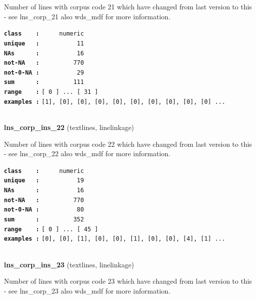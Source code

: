 \documentclass[]{article}
\begin{document}
Number of lines with corpus code 21 which have changed from last version
to this - see lns\_corp\_21 also wds\_mdf for more information.

\textbf{\texttt{class\ \ \ \ :}} \texttt{~~~~~numeric}\\
\textbf{\texttt{unique\ \ \ :}} \texttt{~~~~~~~~~~11}\\
\textbf{\texttt{NAs\ \ \ \ \ \ :}} \texttt{~~~~~~~~~~16}\\
\textbf{\texttt{not-NA\ \ \ :}} \texttt{~~~~~~~~~770}\\
\textbf{\texttt{not-0-NA\ :}} \texttt{~~~~~~~~~~29}\\
\textbf{\texttt{sum\ \ \ \ \ \ :}} \texttt{~~~~~~~~~111}\\
\textbf{\texttt{range\ \ \ \ :}}
\texttt{{[}\ 0\ {]}\ ...\ {[}\ 31\ {]}}\\
\textbf{\texttt{examples\ :}}
\texttt{{[}1{]},\ {[}0{]},\ {[}0{]},\ {[}0{]},\ {[}0{]},\ {[}0{]},\ {[}0{]},\ {[}0{]},\ {[}0{]},\ {[}0{]}\ ...}\\

~

\textbf{lns\_corp\_ins\_22} (textlines, linelinkage)

Number of lines with corpus code 22 which have changed from last version
to this - see lns\_corp\_22 also wds\_mdf for more information.

\textbf{\texttt{class\ \ \ \ :}} \texttt{~~~~~numeric}\\
\textbf{\texttt{unique\ \ \ :}} \texttt{~~~~~~~~~~19}\\
\textbf{\texttt{NAs\ \ \ \ \ \ :}} \texttt{~~~~~~~~~~16}\\
\textbf{\texttt{not-NA\ \ \ :}} \texttt{~~~~~~~~~770}\\
\textbf{\texttt{not-0-NA\ :}} \texttt{~~~~~~~~~~80}\\
\textbf{\texttt{sum\ \ \ \ \ \ :}} \texttt{~~~~~~~~~352}\\
\textbf{\texttt{range\ \ \ \ :}}
\texttt{{[}\ 0\ {]}\ ...\ {[}\ 45\ {]}}\\
\textbf{\texttt{examples\ :}}
\texttt{{[}0{]},\ {[}0{]},\ {[}1{]},\ {[}0{]},\ {[}0{]},\ {[}1{]},\ {[}0{]},\ {[}0{]},\ {[}4{]},\ {[}1{]}\ ...}\\

~

\textbf{lns\_corp\_ins\_23} (textlines, linelinkage)

Number of lines with corpus code 23 which have changed from last version
to this - see lns\_corp\_23 also wds\_mdf for more information.
\end{document}
